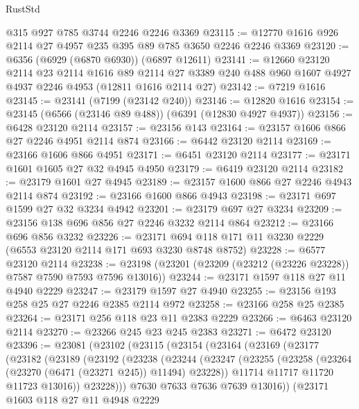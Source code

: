 \begin{lexlean}{RustStd}
\begin{coremodule}
{\begin{coremodule}
{{{{{{{{{{{{{{{{{{{{{{{{{{    @315
    @927
    @785
    @3744
    @2246
    @2246
    @3369
@23115 := @12770 @1616 @926 @2114 @27 @4957 @235 @395 @89 @785 @3650 @2246 @2246 @3369
@23120 := @6356 (@6929 (@6870 @6930)) (@6897 @12611)
@23141 := @12660
    @23120
    @2114
    @23
    @2114
    @1616
    @89
    @2114
    @27
    @3389
    @240
    @488
    @960
    @1607
    @4927
    @4937
    @2246
    @4953
    (@12811 @1616 @2114 @27)
@23142 := @7219 @1616
@23145 := @23141 (@7199 (@23142 @240))
@23146 := @12820 @1616
@23154 := @23145 (@6566 (@23146 @89 @488)) (@6391 (@12830 @4927 @4937))
@23156 := @6428 @23120 @2114
@23157 := @23156 @143
@23164 := @23157 @1606 @866 @27 @2246 @4951 @2114 @874
@23166 := @6442 @23120 @2114
@23169 := @23166 @1606 @866 @4951
@23171 := @6451 @23120 @2114
@23177 := @23171 @1601 @1605 @27 @32 @4945 @4950
@23179 := @6419 @23120 @2114
@23182 := @23179 @1601 @27 @4945
@23189 := @23157 @1600 @866 @27 @2246 @4943 @2114 @874
@23192 := @23166 @1600 @866 @4943
@23198 := @23171 @697 @1599 @27 @32 @3234 @4942
@23201 := @23179 @697 @27 @3234
@23209 := @23156 @138 @696 @856 @27 @2246 @3232 @2114 @864
@23212 := @23166 @696 @856 @3232
@23226 := @23171 @694 @118 @171 @11 @3230 @2229 (@6553 @23120 @2114 @171 @693 @3230 @8748 @8752)
@23228 := @6577 @23120 @2114
@23238 := @23198 (@23201 (@23209 (@23212 (@23226 @23228)) @7587 @7590 @7593 @7596 @13016))
@23244 := @23171 @1597 @118 @27 @11 @4940 @2229
@23247 := @23179 @1597 @27 @4940
@23255 := @23156 @193 @258 @25 @27 @2246 @2385 @2114 @972
@23258 := @23166 @258 @25 @2385
@23264 := @23171 @256 @118 @23 @11 @2383 @2229
@23266 := @6463 @23120 @2114
@23270 := @23266 @245 @23 @245 @2383
@23271 := @6472 @23120
@23396 := @23081
    (@23102
      (@23115
        (@23154
          (@23164
            (@23169
              (@23177
                (@23182
                  (@23189
                    (@23192
                      (@23238
                        (@23244
                          (@23247
                            (@23255
                              (@23258 (@23264 (@23270 (@6471 (@23271 @245)) @11494) @23228))
                              @11714
                              @11717
                              @11720
                              @11723
                              @13016))
                          @23228)))
                    @7630
                    @7633
                    @7636
                    @7639
                    @13016))
                (@23171
                  @1603
                  @118
                  @27
                  @11
                  @4948
                  @2229
}}}}}}}}}}}}}}}}}}}}}}}}}}
\end{coremodule}}
\end{coremodule}
\end{lexlean}
